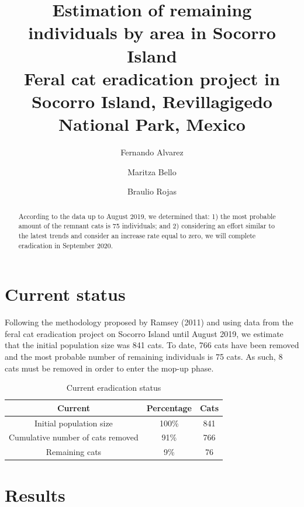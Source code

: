 \documentclass{article}
\title{Estimation of remaining individuals by area in Socorro Island \\
    \Large{Feral cat eradication project in Socorro Island, Revillagigedo National Park, Mexico}}
\author{Fernando Alvarez}
\author{Maritza Bello}
\author{Braulio Rojas}
\affil{Data Science Direction}
\begin{document}
\maketitle

\begin{abstract}
   According to the data up to August 2019, we determined that: 1) the most probable amount of the remnant cats is 75 individuals; and 2) considering an effort similar to the latest trends and consider an increase rate equal to zero, we will complete eradication in September 2020.
\end{abstract}


\section*{Current status}

Following the methodology proposed by Ramsey (2011) and using data from the feral cat eradication project on Socorro Island until August 2019, we estimate that the initial population size was 841 cats. To date, 766 cats have been removed and the most probable number of remaining individuals is 75 cats. As such, 8 cats must be removed in order to enter the mop-up phase.

\begin{table}[H]
\centering
\caption{\small{Current eradication status}}
\label{table:esfuerzoCapturas}
\begin{tabular}{ |c|c|c| }
    \hline
    Current & Percentage & Cats \\
    \hline
    Initial population size & 100\%    & 841 \\
    Cumulative number of cats removed & 91\%     & 766 \\
    Remaining cats & 9\%     & 76 \\
    \hline
\end{tabular}
\end{table}


\section*{Results}
\end{document}
